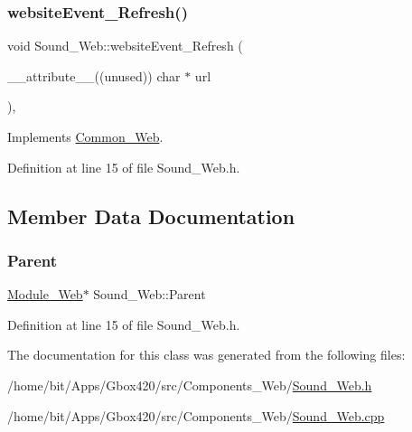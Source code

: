 \subsubsection{\texorpdfstring{website\+Event\+\_\+\+Refresh()}{websiteEvent\_Refresh()}}
{\footnotesize\ttfamily void Sound\+\_\+\+Web\+::website\+Event\+\_\+\+Refresh (\begin{DoxyParamCaption}\item[{\+\_\+\+\_\+attribute\+\_\+\+\_\+((unused)) char $\ast$}]{url }\end{DoxyParamCaption})\hspace{0.3cm}{\ttfamily [inline]}, {\ttfamily [virtual]}}



Implements \hyperlink{class_common___web_aaca7c54fdcf908e4e1256b7b1f6fc212}{Common\+\_\+\+Web}.



Definition at line 15 of file Sound\+\_\+\+Web.\+h.



\subsection{Member Data Documentation}
\mbox{\label{class_sound___web_ac855dfbd5478cd3b7878d7fc1765ab9f}} 
\subsubsection{\texorpdfstring{Parent}{Parent}}
{\footnotesize\ttfamily \hyperlink{class_module___web}{Module\+\_\+\+Web}$\ast$ Sound\+\_\+\+Web\+::\+Parent\hspace{0.3cm}{\ttfamily [protected]}}



Definition at line 15 of file Sound\+\_\+\+Web.\+h.



The documentation for this class was generated from the following files\+:\begin{DoxyCompactItemize}
\item 
/home/bit/\+Apps/\+Gbox420/src/\+Components\+\_\+\+Web/\hyperlink{_sound___web_8h}{Sound\+\_\+\+Web.\+h}\item 
/home/bit/\+Apps/\+Gbox420/src/\+Components\+\_\+\+Web/\hyperlink{_sound___web_8cpp}{Sound\+\_\+\+Web.\+cpp}\end{DoxyCompactItemize}
